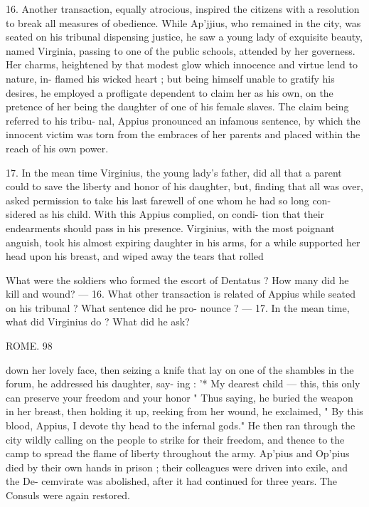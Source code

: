 \documentclass[openany,a4paper]{memoir}
\begin{document}
{16. Another transaction, equally atrocious, inspired the 
citizens with a resolution to break all measures of obedience. 
While Ap'jjius, who remained in the city, was seated on his 
tribunal dispensing justice, he saw a young lady of exquisite 
beauty, named Virginia, passing to one of the public schools, 
attended by her governess. Her charms, heightened by that 
modest glow which innocence and virtue lend to nature, in- 
flamed his wicked heart ; but being himself unable to gratify 
his desires, he employed a profligate dependent to claim her 
as his own, on the pretence of her being the daughter of one 
of his female slaves. The claim being referred to his tribu- 
nal, Appius pronounced an infamous sentence, by which the 
innocent victim was torn from the embraces of her parents 
and placed within the reach of his own power. 

17. In the mean time Virginius, the young lady's father, 
did all that a parent could to save the liberty and honor of 
his daughter, but, finding that all was over, asked permission 
to take his last farewell of one whom he had so long con- 
sidered as his child. With this Appius complied, on condi- 
tion that their endearments should pass in his presence. 
Virginius, with the most poignant anguish, took his almost 
expiring daughter in his arms, for a while supported her 
head upon his breast, and wiped away the tears that rolled 

What were the soldiers who formed the escort of Dentatus ? How 
many did he kill and wound? — 16. What other transaction is related 
of Appius while seated on his tribunal ? What sentence did he pro- 
nounce ? — 17. In the mean time, what did Virginius do ? What did he 
ask? 



ROME. 98 

down her lovely face, then seizing a knife that lay on one of 
the shambles in the forum, he addressed his daughter, say- 
ing : '* My dearest child — this, this only can preserve your 
freedom and your honor " Thus saying, he buried the 
weapon in her breast, then holding it up, reeking from her 
wound, he exclaimed, " By this blood, Appius, I devote thy 
head to the infernal gods." He then ran through the city 
wildly calling on the people to strike for their freedom, and 
thence to the camp to spread the flame of liberty throughout 
the army. Ap'pius and Op'pius died by their own hands in 
prison ; their colleagues were driven into exile, and the De- 
cemvirate was abolished, after it had continued for three 
years. The Consuls were again restored. 

}
\end{document}
